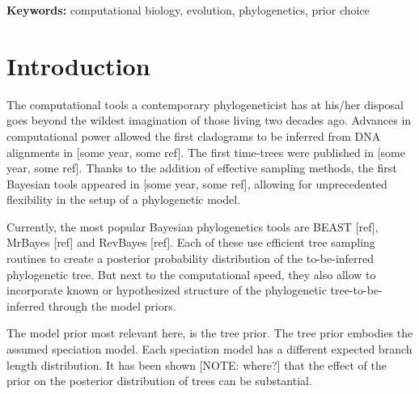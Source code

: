 \documentclass{article}
\begin{document}
\begin{abstract}


\end{abstract}

{\bf Keywords:} computational biology, evolution, phylogenetics, prior choice

\section{Introduction}

The computational tools a contemporary phylogeneticist has at his/her disposal
goes beyond the wildest imagination of those living two decades ago. 
Advances in computational power allowed the first cladograms to be inferred 
from DNA alignments in [some year, some ref]. The first time-trees were
published in [some year, some ref]. Thanks to the addition of effective sampling
methods, the first Bayesian tools appeared in [some year, some ref], allowing
for unprecedented flexibility in the setup of a phylogenetic model.

Currently, the most popular Bayesian phylogenetics tools are BEAST [ref],  
MrBayes [ref] and RevBayes [ref]. Each of these use efficient tree sampling 
routines to create a posterior probability distribution of the to-be-inferred 
phylogenetic tree. But next to the computational speed, they also allow
to incorporate known or hypothesized structure of the phylogenetic 
tree-to-be-inferred through the model priors.

The model prior most relevant here, is the tree prior. The tree prior
embodies the assumed speciation model. Each speciation model has a
different expected branch length distribution. It has been shown 
[NOTE: where?] that the effect of the prior on the posterior distribution 
of trees can be substantial. 
\end{document}
